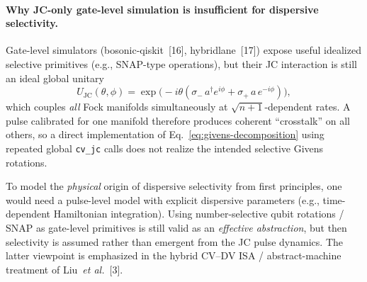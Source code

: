 \documentclass[11pt]{article}
\begin{document}
\paragraph{Why JC-only gate-level simulation is insufficient for dispersive selectivity.}
Gate-level simulators (bosonic-qiskit~[16], hybridlane~[17]) expose useful idealized selective primitives
(e.g., SNAP-type operations), but their JC interaction is still an ideal global unitary
\begin{equation}
U_{\mathrm{JC}}(\theta,\phi)
=\exp\!\bigl(-i\theta(\sigma_-\,a^\dagger e^{i\phi}+\sigma_+\,a\,e^{-i\phi})\bigr),
\label{eq:global-jc}
\end{equation}
which couples \emph{all} Fock manifolds simultaneously at $\sqrt{n+1}$-dependent rates.
A pulse calibrated for one manifold therefore produces coherent ``crosstalk'' on all others, so a direct
implementation of Eq.~\eqref{eq:givens-decomposition} using repeated global \texttt{cv\_jc} calls does not realize the intended
selective Givens rotations.

To model the \emph{physical} origin of dispersive selectivity from first principles, one would need a pulse-level model with explicit
dispersive parameters (e.g., time-dependent Hamiltonian integration).  Using number-selective qubit rotations / SNAP as gate-level primitives
is still valid as an \emph{effective abstraction}, but then selectivity is assumed rather than emergent from the JC pulse dynamics. The latter viewpoint is emphasized in
the hybrid CV--DV ISA / abstract-machine treatment of Liu~\emph{et al.}~[3].
\end{document}
